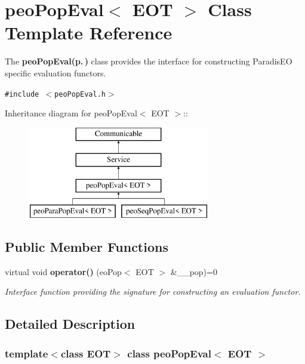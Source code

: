 \section{peo\-Pop\-Eval$<$ EOT $>$ Class Template Reference}
\label{classpeo_pop_eval}
The {\bf {\bf peo\-Pop\-Eval}{\rm (p.\,\pageref{classpeo_pop_eval})}} class provides the interface for constructing Paradis\-EO specific evaluation functors.  


{\tt \#include $<$peo\-Pop\-Eval.h$>$}

Inheritance diagram for peo\-Pop\-Eval$<$ EOT $>$::\begin{figure}[H]
\begin{center}
\leavevmode
\includegraphics[height=4cm]{classpeo_pop_eval}
\end{center}
\end{figure}
\subsection*{Public Member Functions}
\begin{CompactItemize}
\item 
virtual void {\bf operator()} (eo\-Pop$<$ EOT $>$ \&\_\-\_\-pop)=0\label{classpeo_pop_eval_2f208067a5e39c3b26c1234050a41e8f}

\begin{CompactList}\small\item\em Interface function providing the signature for constructing an evaluation functor. \item\end{CompactList}\end{CompactItemize}


\subsection{Detailed Description}
\subsubsection*{template$<$class EOT$>$ class peo\-Pop\-Eval$<$ EOT $>$}

